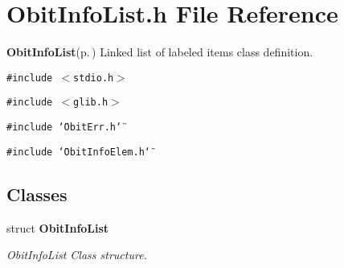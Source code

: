 \section{Obit\-Info\-List.h File Reference}
\label{ObitInfoList_8h}
{\bf Obit\-Info\-List}{\rm (p.\,\pageref{structObitInfoList})} Linked list of labeled items class definition. 

{\tt \#include $<$stdio.h$>$}\par
{\tt \#include $<$glib.h$>$}\par
{\tt \#include \char`\"{}Obit\-Err.h\char`\"{}}\par
{\tt \#include \char`\"{}Obit\-Info\-Elem.h\char`\"{}}\par
\subsection*{Classes}
\begin{CompactItemize}
\item 
struct {\bf Obit\-Info\-List}
\begin{CompactList}\small\item\em Obit\-Info\-List Class structure. \item\end{CompactList}\end{CompactItemize}
